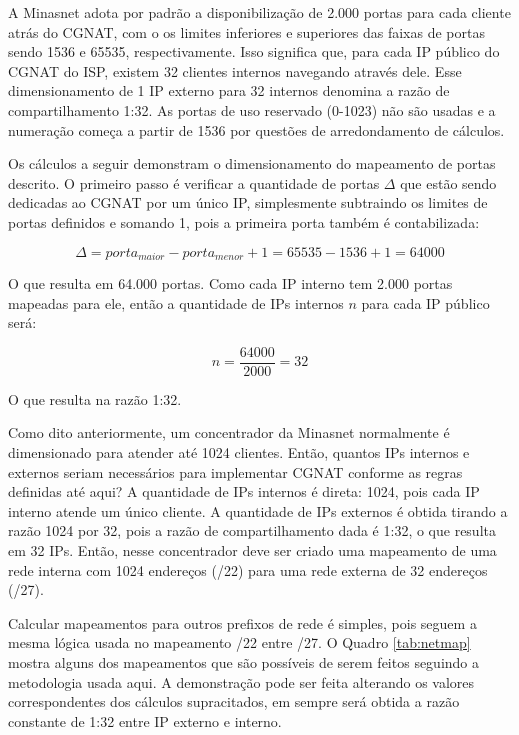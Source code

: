     A Minasnet adota por padrão a disponibilização de 2.000 portas para cada cliente atrás do CGNAT, com o os limites inferiores e superiores das faixas de portas sendo 1536 e 65535, respectivamente. Isso significa que, para cada IP público do CGNAT do ISP, existem 32 clientes internos navegando através dele. Esse dimensionamento de 1 IP externo para 32 internos denomina a razão de compartilhamento 1:32. As portas de uso reservado (0-1023) não são usadas e a numeração começa a partir de 1536 por questões de arredondamento de cálculos.
    
    Os cálculos a seguir demonstram o dimensionamento do mapeamento de portas descrito. O primeiro passo é verificar a quantidade de portas $ \Delta $ que estão sendo dedicadas ao CGNAT por um único IP, simplesmente subtraindo os limites de portas definidos e somando 1, pois a primeira porta também é contabilizada:

    \begin{equation}
        \Delta = porta_{maior} - porta_{menor} + 1
               = 65535 - 1536 + 1
               = 64000
    \end{equation}
    
    O que resulta em 64.000 portas. Como cada IP interno tem 2.000 portas mapeadas para ele, então a quantidade de IPs internos $ n $ para cada IP público será:

    \begin{equation}
        n = \frac{64000}{2000}
          = 32
    \end{equation}

    O que resulta na razão 1:32.

    Como dito anteriormente, um concentrador da Minasnet normalmente é dimensionado para atender até 1024 clientes. Então, quantos IPs internos e externos seriam necessários para implementar CGNAT conforme as regras definidas até aqui? A quantidade de IPs internos é direta: 1024, pois cada IP interno atende um único cliente. A quantidade de IPs externos é obtida tirando a razão 1024 por 32, pois a razão de compartilhamento dada é 1:32, o que resulta em 32 IPs. Então, nesse concentrador deve ser criado uma mapeamento de uma rede interna com 1024 endereços (/22) para uma rede externa de 32 endereços (/27).
    
    Calcular mapeamentos para outros prefixos de rede é simples, pois seguem a mesma lógica usada no mapeamento /22 entre /27. O Quadro \ref{tab:netmap} mostra alguns dos mapeamentos que são possíveis de serem feitos seguindo a metodologia usada aqui. A demonstração pode ser feita alterando os valores correspondentes dos cálculos supracitados, em sempre será obtida a razão constante de 1:32 entre IP externo e interno.

